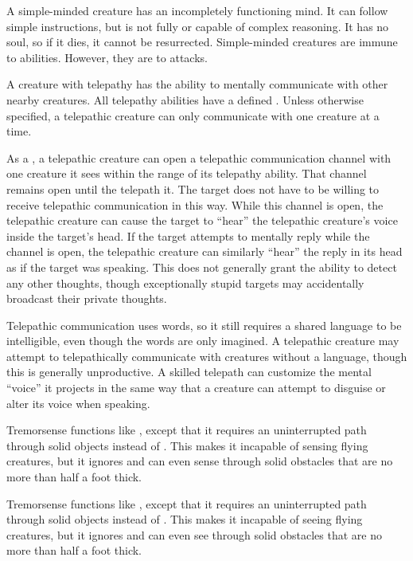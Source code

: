   A simple-minded creature has an incompletely functioning mind.
  It can follow simple instructions, but is not fully  or capable of complex reasoning.
  It has no soul, so if it dies, it cannot be resurrected.
  Simple-minded creatures are immune to  abilities.
  However, they are \vulnerable to  attacks.

  A creature with telepathy has the ability to mentally communicate with other nearby creatures.
  All telepathy abilities have a defined .
  Unless otherwise specified, a telepathic creature can only communicate with one creature at a time.

  As a , a telepathic creature can open a telepathic communication channel with one creature it sees within the range of its telepathy ability.
  That channel remains open until the telepath  it.
  The target does not have to be willing to receive telepathic communication in this way.
  While this channel is open, the telepathic creature can cause the target to ``hear'' the telepathic creature's voice inside the target's head.
  If the target attempts to mentally reply while the channel is open, the telepathic creature can similarly ``hear'' the reply in its head as if the target was speaking.
  This does not generally grant the ability to detect any other thoughts, though exceptionally stupid targets may accidentally broadcast their private thoughts.

  Telepathic communication uses words, so it still requires a shared language to be intelligible, even though the words are only imagined.
  A telepathic creature may attempt to telepathically communicate with creatures without a language, though this is generally unproductive.
  A skilled telepath can customize the mental ``voice'' it projects in the same way that a creature can attempt to disguise or alter its voice when speaking.

  Tremorsense functions like , except that it requires an uninterrupted path through solid objects instead of .
  This makes it incapable of sensing flying creatures, but it ignores  and can even sense through solid obstacles that are no more than half a foot thick.

  Tremorsense functions like , except that it requires an uninterrupted path through solid objects instead of .
  This makes it incapable of seeing flying creatures, but it ignores  and can even see through solid obstacles that are no more than half a foot thick.

